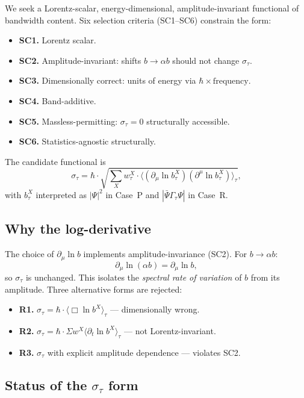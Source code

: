 \documentclass[11pt,a4paper]{article}
\begin{document}
We seek a Lorentz-scalar, energy-dimensional, amplitude-invariant functional of bandwidth content. Six selection criteria (SC1--SC6) constrain the form:
\begin{itemize}
  \item \textbf{SC1.} Lorentz scalar.
  \item \textbf{SC2.} Amplitude-invariant: shifts $b \to \alpha b$ should not change $\sigma_\tau$.
  \item \textbf{SC3.} Dimensionally correct: units of energy via $\hbar \times \mathrm{frequency}$.
  \item \textbf{SC4.} Band-additive.
  \item \textbf{SC5.} Massless-permitting: $\sigma_\tau = 0$ structurally accessible.
  \item \textbf{SC6.} Statistics-agnostic structurally.
\end{itemize}
The candidate functional is
\begin{equation}
\boxed{\sigma_\tau = \hbar \cdot \sqrt{\sum_X w_\tau^X \cdot \langle (\partial_\mu \ln b_\tau^X)(\partial^\mu \ln b_\tau^X) \rangle_\tau},}
\label{eq:sigma}
\end{equation}
with $b_\tau^X$ interpreted as $|\Psi|^2$ in Case~P and $|\bar\Psi \Gamma_\tau \Psi|$ in Case~R.

\subsection{Why the log-derivative}

The choice of $\partial_\mu \ln b$ implements amplitude-invariance (SC2). For $b \to \alpha b$:
\begin{equation}
\partial_\mu \ln (\alpha b) = \partial_\mu \ln b,
\end{equation}
so $\sigma_\tau$ is unchanged. This isolates the \emph{spectral rate of variation} of $b$ from its amplitude. Three alternative forms are rejected:
\begin{itemize}
  \item \textbf{R1.} $\sigma_\tau = \hbar \cdot \langle \Box \ln b^X \rangle_\tau$ --- dimensionally wrong.
  \item \textbf{R2.} $\sigma_\tau = \hbar \cdot \Sigma w^X \langle \partial_t \ln b^X \rangle_\tau$ --- not Lorentz-invariant.
  \item \textbf{R3.} $\sigma_\tau$ with explicit amplitude dependence --- violates SC2.
\end{itemize}

\subsection{Status of the $\sigma_\tau$ form}
\end{document}
